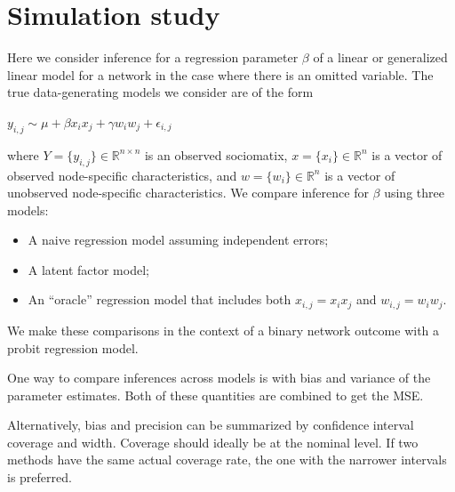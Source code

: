\section{Simulation study}

Here we consider inference for a regression parameter $\beta$ of a linear or generalized linear model for a network in the case where there is an omitted variable. The true data-generating models we consider are of the form 

$y_{i,j} \sim  \mu + \beta x_i x_j + \gamma w_i w_j + \epsilon_{i,j} $

where $Y= \{y_{i,j}\}\in \mathbb R^{n\times n}$ is an observed sociomatix, $x = \{x_i \} \in \mathbb R^n$ is a vector of observed node-specific characteristics, and $w = \{ w_i\} \in \mathbb R^n$ is a vector of unobserved node-specific characteristics. We compare inference for $\beta$ using three models:

\begin{itemize}
	\item A naive regression model assuming independent errors; 
	\item A latent factor model; 
	\item An ``oracle'' regression model that includes both $x_{i,j}=x_i x_j$ and $w_{i,j}=w_i w_j$. 
\end{itemize}

We make these comparisons in the context of a binary network outcome with a probit regression model. 

One way to compare inferences across models is  with bias and variance of the parameter estimates. Both of these quantities are combined to get the MSE. 

Alternatively, bias and precision can be summarized by confidence interval coverage and width. Coverage should ideally be at the nominal level. If two methods have the same actual coverage rate, the one with the narrower intervals is preferred. 

